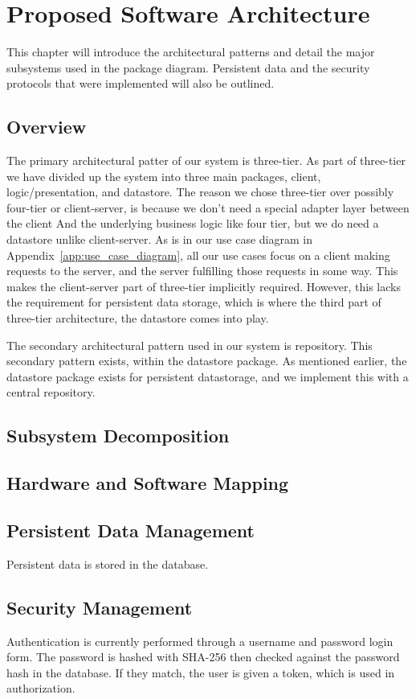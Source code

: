 \documentclass{report}
\begin{document}
\chapter{Proposed Software Architecture}
	This chapter will introduce the architectural patterns and detail the major subsystems used in the package diagram.
	Persistent data and the security protocols that were implemented will also be outlined.
\section{Overview}
	The primary architectural patter of our system is three-tier.
	As part of three-tier we have divided up the system into three main packages,
	client, logic/presentation, and datastore.
	The reason we chose three-tier over possibly four-tier or client-server,
	is because we don't need a special adapter layer between the client And
	the underlying business logic like four tier, but we do need a datastore
	unlike client-server.
	As is in our use case diagram in Appendix~\ref{app:use_case_diagram}, all our use cases
	focus on a client making requests to the server, and the server fulfilling those requests in some way.
	This makes the client-server part of three-tier implicitly required.
	However, this lacks the requirement for persistent data storage,
	which is where the third part of three-tier architecture, the datastore
	comes into play.

	The secondary architectural pattern used in our system is repository.
	This secondary pattern exists, within the datastore package.
	As mentioned earlier, the datastore package exists for persistent datastorage,
	and we implement this with a central repository.

\section{Subsystem Decomposition}
\section{Hardware and Software Mapping}
\section{Persistent Data Management}
	Persistent data is stored in the database.
	

\section{Security Management}
	Authentication is currently performed through a username and password login form.
	The password is hashed with SHA-256 then checked against the password hash in the database.
	If they match, the user is given a token, which is used in authorization.
\end{document}

